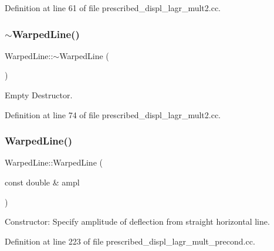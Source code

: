 Definition at line 61 of file prescribed\+\_\+displ\+\_\+lagr\+\_\+mult2.\+cc.

\mbox{\label{classWarpedLine_a4cb07fb7f06d42e2008afe65d8750cad}} 
\subsubsection{\texorpdfstring{$\sim$\+Warped\+Line()}{~WarpedLine()}\hspace{0.1cm}{\footnotesize\ttfamily [2/3]}}
{\footnotesize\ttfamily Warped\+Line\+::$\sim$\+Warped\+Line (\begin{DoxyParamCaption}{ }\end{DoxyParamCaption})\hspace{0.3cm}{\ttfamily [inline]}}



Empty Destructor. 



Definition at line 74 of file prescribed\+\_\+displ\+\_\+lagr\+\_\+mult2.\+cc.

\mbox{\label{classWarpedLine_a9d80dca2c907b426f7130579c94f3310}} 
\subsubsection{\texorpdfstring{Warped\+Line()}{WarpedLine()}\hspace{0.1cm}{\footnotesize\ttfamily [5/6]}}
{\footnotesize\ttfamily Warped\+Line\+::\+Warped\+Line (\begin{DoxyParamCaption}\item[{const double \&}]{ampl }\end{DoxyParamCaption})\hspace{0.3cm}{\ttfamily [inline]}}



Constructor\+: Specify amplitude of deflection from straight horizontal line. 



Definition at line 223 of file prescribed\+\_\+displ\+\_\+lagr\+\_\+mult\+\_\+precond.\+cc.

\mbox{\label{classWarpedLine_a53a7426303864ea2d34aeba0a3f6324f}} 
